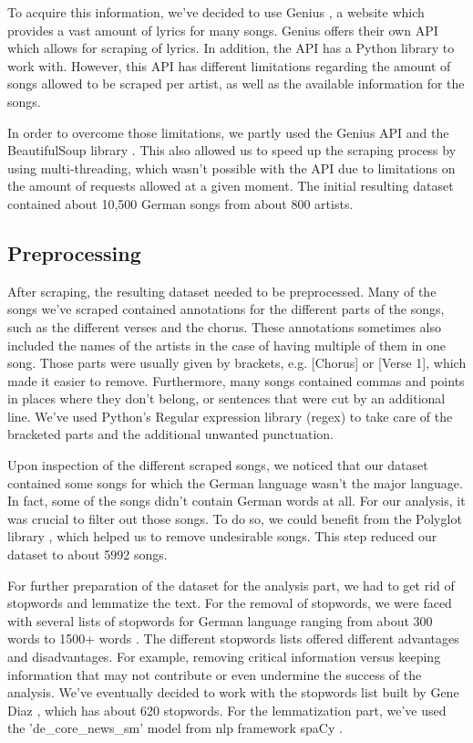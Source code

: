 To acquire this information, we've decided to use Genius \cite{genius}, a website which provides a vast amount of lyrics for many songs. Genius offers their own API which allows for scraping of lyrics. In addition, the API has a Python library to work with. However, this API has different limitations regarding the amount of songs allowed to be scraped per artist, as well as the available information for the songs. 

In order to overcome those limitations, we partly used the Genius API and the BeautifulSoup library \cite{beatifulsoup}. This also allowed us to speed up the scraping process by using multi-threading, which wasn't possible with the API due to limitations on the amount of requests allowed at a given moment. The initial resulting dataset contained about 10,500 German songs from about 800 artists.

\subsection*{Preprocessing}

After scraping, the resulting dataset needed to be preprocessed. Many of the songs we've scraped contained annotations for the different parts of the songs, such as the different verses and the chorus. These annotations sometimes also included the names of the artists in the case of having multiple of them in one song. Those parts were usually given by brackets, e.g. [Chorus] or [Verse 1], which made it easier to remove. Furthermore, many songs contained commas and points in places where they don't belong, or sentences that were cut by an additional line. We've used Python's Regular expression library (regex) to take care of the bracketed parts and the additional unwanted punctuation.

Upon inspection of the different scraped songs, we noticed that our dataset contained some songs for which the German language wasn't the major language. In fact, some of the songs didn't contain German words at all. For our analysis, it was crucial to filter out those songs. To do so, we could benefit from the Polyglot library \cite{polyglot}, which helped us to remove undesirable songs. This step reduced our dataset to about 5992 songs.

For further preparation of the dataset for the analysis part, we had to get rid of stopwords and lemmatize the text. For the removal of stopwords, we were faced with several lists of stopwords for German language ranging from about 300 words to 1500+ words \cite{stopwords1}. The different stopwords lists offered different advantages and disadvantages. For example, removing critical information versus keeping information that may not contribute or even undermine the success of the analysis. We've eventually decided to work with the stopwords list built by Gene Diaz \cite{stopwords2}, which has about 620 stopwords. For the lemmatization part, we've used the 'de\_core\_news\_sm' model from nlp framework spaCy \cite{spacy}.

